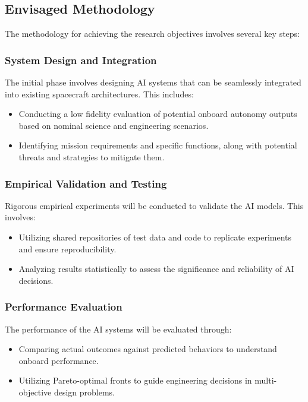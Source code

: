 \documentclass[a4paper,12pt]{article}
\begin{document}
\subsection{Envisaged Methodology}

The methodology for achieving the research objectives involves several key steps:

\subsubsection{System Design and Integration}

The initial phase involves designing AI systems that can be seamlessly integrated into existing spacecraft architectures. This includes:

\begin{itemize}
    \item Conducting a low fidelity evaluation of potential onboard autonomy outputs based on nominal science and engineering scenarios.
    \item Identifying mission requirements and specific functions, along with potential threats and strategies to mitigate them.
\end{itemize}

\subsubsection{Empirical Validation and Testing}

Rigorous empirical experiments will be conducted to validate the AI models. This involves:

\begin{itemize}
    \item Utilizing shared repositories of test data and code to replicate experiments and ensure reproducibility.
    \item Analyzing results statistically to assess the significance and reliability of AI decisions.
\end{itemize}

\subsubsection{Performance Evaluation}

The performance of the AI systems will be evaluated through:

\begin{itemize}
    \item Comparing actual outcomes against predicted behaviors to understand onboard performance.
    \item Utilizing Pareto-optimal fronts to guide engineering decisions in multi-objective design problems.
\end{itemize}
\end{document}
